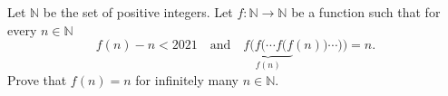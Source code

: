 Let $\mathbb{N}$ be the set of positive integers.
Let $f\colon\mathbb{N}\to\mathbb{N}$ be a function such that for every $n\in\mathbb{N}$
$$f(n)-n < 2021 \quad \text {and} \quad \underbrace{f(f(\cdots f(f}_{f(n)}(n))\cdots)) = n.$$
Prove that $f(n) = n$ for infinitely many $n\in\mathbb{N}$.
